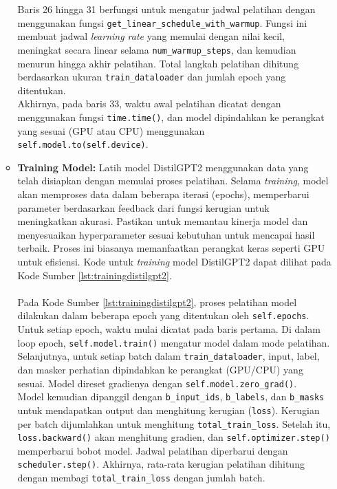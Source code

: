 \begin{enumerate}[topsep=0pt]
\begin{itemize}
      Baris 26 hingga 31 berfungsi untuk mengatur jadwal pelatihan dengan menggunakan fungsi \texttt{get\_linear\_schedule\_with\_warmup}. Fungsi ini membuat jadwal \emph{learning rate} yang memulai dengan nilai kecil, meningkat secara linear selama \texttt{num\_warmup\_steps}, dan kemudian menurun hingga akhir pelatihan. Total langkah pelatihan dihitung berdasarkan ukuran \texttt{train\_dataloader} dan jumlah epoch yang ditentukan.
      \\

      Akhirnya, pada baris 33, waktu awal pelatihan dicatat dengan menggunakan fungsi \texttt{time.time()}, dan model dipindahkan ke perangkat yang sesuai (GPU atau CPU) menggunakan \texttt{self.model.to(self.device)}.
      \\

      \item \textbf{Training Model:} Latih model DistilGPT2 menggunakan data yang telah disiapkan dengan memulai proses pelatihan. Selama \emph{training}, model akan memproses data dalam beberapa iterasi (epochs), memperbarui parameter berdasarkan feedback dari fungsi kerugian untuk meningkatkan akurasi. Pastikan untuk memantau kinerja model dan menyesuaikan hyperparameter sesuai kebutuhan untuk mencapai hasil terbaik. Proses ini biasanya memanfaatkan perangkat keras seperti GPU untuk efisiensi. Kode untuk \emph{training} model DistilGPT2 dapat dilihat pada Kode Sumber \ref{lst:trainingdistilgpt2}.
      \\
      \\
      

      
      

      Pada Kode Sumber \ref{lst:trainingdistilgpt2}, proses pelatihan model dilakukan dalam beberapa epoch yang ditentukan oleh \texttt{self.epochs}. Untuk setiap epoch, waktu mulai dicatat pada baris pertama.
      Di dalam loop epoch, \texttt{self.model.train()} mengatur model dalam mode pelatihan. Selanjutnya, untuk setiap batch dalam \texttt{train\_dataloader}, input, label, dan masker perhatian dipindahkan ke perangkat (GPU/CPU) yang sesuai. Model direset gradienya dengan \texttt{self.model.zero\_grad()}.
      \\

      Model kemudian dipanggil dengan \texttt{b\_input\_ids}, \texttt{b\_labels}, dan \texttt{b\_masks} untuk mendapatkan output dan menghitung kerugian (\texttt{loss}). Kerugian per batch dijumlahkan untuk menghitung \texttt{total\_train\_loss}. Setelah itu, \texttt{loss.backward()} akan menghitung gradien, dan \texttt{self.optimizer.step()} memperbarui bobot model. Jadwal pelatihan diperbarui dengan \texttt{scheduler.step()}.
      Akhirnya, rata-rata kerugian pelatihan dihitung dengan membagi \texttt{total\_train\_loss} dengan jumlah batch.
      \\
      \\


\end{itemize}
\end{enumerate}
